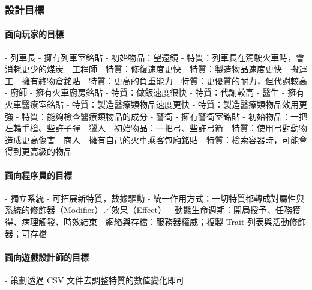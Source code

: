 \subsubsection{設計目標}
\paragraph{\Large\bfseries 面向玩家的目標}
\begin{markdown}
- 列車長
  - 擁有列車室銘貼
  - 初始物品：望遠鏡
  - 特質：列車長在駕駛火車時，會消耗更少的煤炭
- 工程師
  - 特質：修復速度更快
  - 特質：製造物品速度更快
- 搬運工
  - 擁有終物倉銘貼
  - 特質：更高的負重能力
  - 特質：更優質的耐力，但代謝較高
- 廚師
  - 擁有火車廚房銘貼
  - 特質：做飯速度很快
  - 特質：代謝較高
- 醫生
  - 擁有火車醫療室銘貼
  - 特質：製造醫療類物品速度更快
  - 特質：製造醫療類物品效用更強
  - 特質：能夠檢查醫療類物品的成分
- 警衛
  - 擁有警衛室銘貼
  - 初始物品：一把左輪手槍、些許子彈
- 獵人
  - 初始物品：一把弓、些許弓箭
  - 特質：使用弓對動物造成更高傷害
- 商人
  - 擁有自己的火車乘客包廂銘貼
  - 特質：檢索容器時，可能會得到更高級的物品
\end{markdown}
\paragraph{\Large\bfseries 面向程序員的目標}
\begin{markdown}
- 獨立系統
- 可拓展新特質，數據驅動
- 統一作用方式：一切特質都轉成對屬性與系統的修飾器（Modifier）／效果（Effect）
- 動態生命週期：開局授予、任務獲得、病理觸發、時效結束
- 網絡與存檔：服務器權威；複製 Trait 列表與活動修飾器；可存檔
\end{markdown}
\paragraph{\Large\bfseries 面向遊戲設計師的目標}
\begin{markdown}
- 策劃透過 CSV 文件去調整特質的數值變化即可
\end{markdown}

